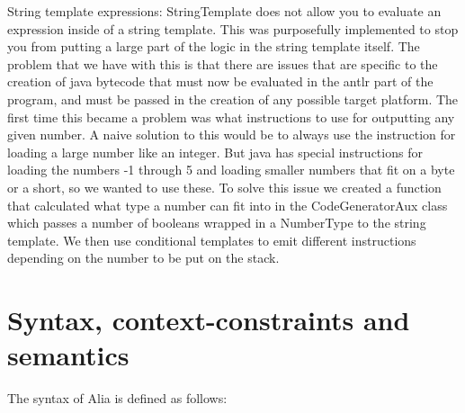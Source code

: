 \documentclass[paper=a4, fontsize=11pt]{article}
\numberwithin{equation}{section}		%
\numberwithin{figure}{section}			%
\numberwithin{table}{section}				%
\begin{document}
String template expressions: StringTemplate does not allow you to evaluate an expression inside of a string template. This was purposefully implemented to stop you from putting a large part of the logic in the string template itself. The problem that we have with this is that there are issues that are specific to the creation of java bytecode that must now be evaluated in the antlr part of the program, and must be passed in the creation of any possible target platform. The first time this became a problem was what instructions to use for outputting any given number. A naive solution to this would be to always use the instruction for loading a large number like an integer. But java has special instructions for loading the numbers -1 through 5 and loading smaller numbers that fit on a byte or a short, so we wanted to use these. To solve this issue we created a function that calculated what type a number can fit into in the CodeGeneratorAux class which passes a number of booleans wrapped in a NumberType to the string template. We then use conditional templates to emit different instructions depending on the number to be put on the stack.




\section{Syntax, context-constraints and semantics}
The syntax of Alia is defined as follows:
\end{document}
